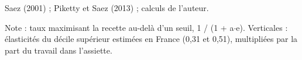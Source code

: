 Saez (2001) ; Piketty et Saez (2013) ; calculs de l'auteur.\par Note : taux maximisant la recette au-delà d'un seuil, 1 / (1 + a$\cdot$e). Verticales : élasticités du décile supérieur estimées en France (0,31 et 0,51), multipliées par la part du travail dans l'assiette.
